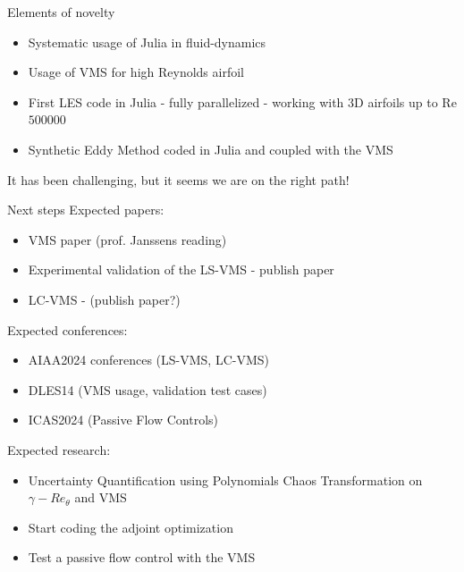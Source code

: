 \documentclass{beamer}
\begin{document}
\begin{frame}{Elements of novelty}
\begin{itemize}
	\item Systematic usage of Julia in fluid-dynamics
	\item Usage of VMS for high Reynolds airfoil
	\item First LES code in Julia - fully parallelized - working with 3D airfoils up to Re $\num{500000}$ 
	\item Synthetic Eddy Method coded in Julia and coupled with the VMS
\end{itemize}

It has been challenging, but it seems we are on the right path!

\end{frame}

\begin{frame}{Next steps}
Expected papers:
\begin{itemize}
	\item VMS paper (prof. Janssens reading)
	\item Experimental validation of the LS-VMS - publish paper
	\item LC-VMS - (publish paper?)
\end{itemize}

Expected conferences:
\begin{itemize}
	\item AIAA2024 conferences (LS-VMS, LC-VMS)
	\item DLES14 (VMS usage, validation test cases)
	\item ICAS2024 (Passive Flow Controls)
\end{itemize}


Expected research:
\begin{itemize}
	\item Uncertainty Quantification using Polynomials Chaos Transformation on $\gamma-Re_\theta$ and VMS
	\item Start coding the adjoint optimization
	\item Test a passive flow control with the VMS
\end{itemize}

\end{frame}
\end{document}
